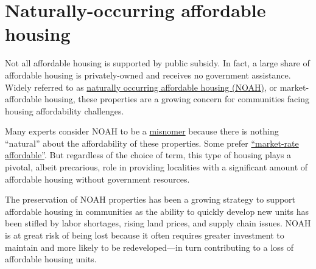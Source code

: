 \documentclass[
  letterpaper,
  DIV=11,
  numbers=noendperiod]{scrreprt}
\begin{document}
\hypertarget{naturally-occurring-affordable-housing}{%
\section{Naturally-occurring affordable
housing}\label{naturally-occurring-affordable-housing}}

Not all affordable housing is supported by public subsidy. In fact, a
large share of affordable housing is privately-owned and receives no
government assistance. Widely referred to as
\href{https://www.mckinsey.com/industries/public-and-social-sector/our-insights/preserving-the-largest-and-most-at-risk-supply-of-affordable-housing}{naturally
occurring affordable housing (NOAH)}, or market-affordable housing,
these properties are a growing concern for communities facing housing
affordability challenges.

\begin{tcolorbox}[enhanced jigsaw, colframe=quarto-callout-note-color-frame, arc=.35mm, bottomrule=.15mm, colbacktitle=quarto-callout-note-color!10!white, opacityback=0, left=2mm, rightrule=.15mm, title=\textcolor{quarto-callout-note-color}{\faInfo}\hspace{0.5em}{Is it really ``naturally-occurring''?}, colback=white, coltitle=black, toptitle=1mm, leftrule=.75mm, titlerule=0mm, breakable, opacitybacktitle=0.6, toprule=.15mm, bottomtitle=1mm]

Many experts consider NOAH to be a
\href{https://cityobservatory.org/the-myth-of-naturally-occurring-affordable-housing/}{misnomer}
because there is nothing ``natural'' about the affordability of these
properties. Some prefer
\href{https://www.allianceforhousingsolutions.org/market-rate-affordable-housing}{``market-rate
affordable''}. But regardless of the choice of term, this type of
housing plays a pivotal, albeit precarious, role in providing localities
with a significant amount of affordable housing without government
resources.

\end{tcolorbox}

The preservation of NOAH properties has been a growing strategy to
support affordable housing in communities as the ability to quickly
develop new units has been stifled by labor shortages, rising land
prices, and supply chain issues. NOAH is at great risk of being lost
because it often requires greater investment to maintain and more likely
to be redeveloped---in turn contributing to a loss of affordable housing
units.
\end{document}
